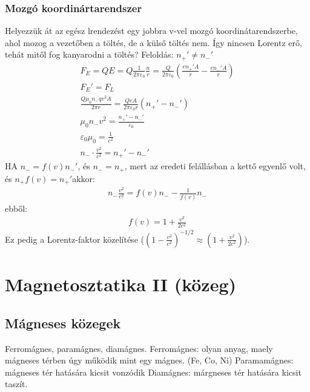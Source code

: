\documentclass{article}
\begin{document}
\subsubsection{Mozgó koordinártarendszer}
Helyezzük át az egész lrendezést egy jobbra v-vel mozgó koordinátarendszerbe, ahol mozog a vezetőben a töltés,  de a külső töltés nem. Így nincsen Lorentz erő,  tehát mitől fog kanyarodni a töltés? Feloldás: $n_+' \neq n_-'$
\begin{gather*}
F_E=QE=Q\frac{1}{2\pi \varepsilon_0} \frac{n}{r}= \frac{Q}{2\pi \varepsilon_0} \left(  \frac{en_+'A}{r} -\frac{en_-'A}{r} \right) \\
F_E' = F_L \\
\frac{Q\mu_0 n_- q v^2 A}{2\pi r} = \frac{Q e A}{2\pi \varepsilon_0 r} (n_+'-n_-') \\
\mu_0 n_- v^2 = \frac{n_+' - n_-'}{\varepsilon_0} \\
\varepsilon_0 \mu_0 = \frac{1}{c^2} \\
n_- \cdot \frac{v^2}{c^2} = n_+'-n_-'
\end{gather*}
HA $n_- = f(v)n_-'$, és $n_-=n_+$, mert az eredeti felállásban a kettő egyenlő volt, és $n_+f(v) = n_+'$akkor:
\begin{gather*}
n_- \frac{v^2}{c^2} = f(v)n_- - \frac{1}{f(v)}n_-
\end{gather*}
ebből:
\begin{gather*}
f(v)= 1+\frac{v^2}{2c^2}
\end{gather*}
Ez pedig a Lorentz-faktor közelítése ($(1-\frac{v^2}{c^2})^{-1/2} \approx (1+\frac{v^2}{2c^2})$). 
\newpage
\section{Magnetosztatika II (közeg)}
\subsection{Mágneses közegek}
Ferromágnes, paramágnes, diamágnes. 
Ferromágnes: olyan anyag, maely mágneses térben úgy működik mint egy mágnes. (Fe, Co, Ni)
Paramamágnes: mágneses tér hatására kicsit vonzódik
Diamágnes: márgneses tér hatására kicsit taszít.
\end{document}
